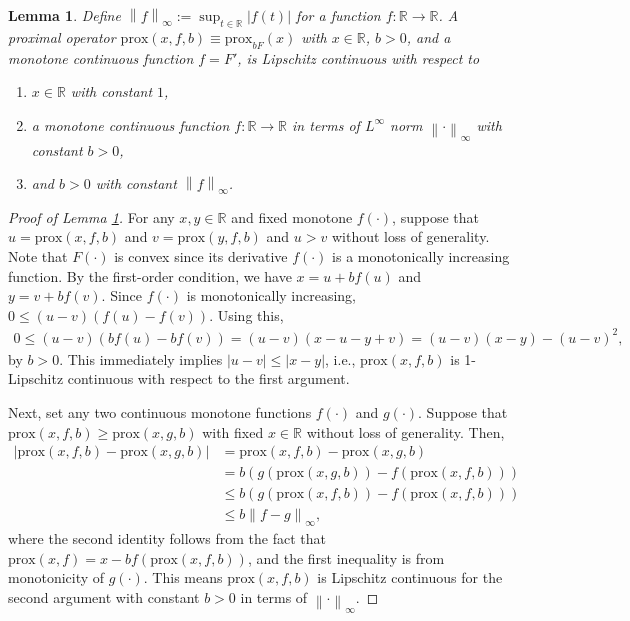 \documentclass[12pt,reqno]{amsart}
\newtheorem{lemma}{Lemma}
\newcommand{\abs}[1]{\left\lvert#1\right\rvert}
\newcommand{\norm}[1]{\left\lVert#1\right\rVert}
\newcommand{\rbr}[1]{\left(#1\right)}
\newcommand{\R}{\mathbb{R}}
\newcommand{\cc}{\color{black}}
\begin{document}
\begin{lemma}
\label{lem:lip-prox}
Define $\norm{f}_\infty:=\sup_{t\in\R}|f(t)|$ for a function $f:\R\to\R$. A proximal operator $\mathrm{prox}(x,f,b)\equiv\mathrm{prox}_{bF}(x)$ with $x\in\R$, $b>0$, and a monotone continuous function $f=F'$, is Lipschitz continuous with respect to
\begin{enumerate}
    \item[(i)] $x\in\R$ with constant $1$,
    \item[(ii)] a monotone continuous function $f:\R\rightarrow\R$ in terms of $L^\infty$ norm $\norm{\cdot}_\infty$ with constant $b>0$,
    \item[(iii)] and $b>0$ with constant $\norm{f}_\infty$.
\end{enumerate}
\end{lemma}
\begin{proof}[Proof of Lemma \ref{lem:lip-prox}] 
For any $x,y\in\R$ and fixed monotone $f(\cdot)$, suppose that $u=\text{prox}(x,f,b)$ and $v=\text{prox}(y,f,b)$ and $u>v$ without loss of generality. Note that $F(\cdot)$ is convex since its derivative $f(\cdot)$ is a monotonically increasing function. By the first-order condition, we have $x=u+bf(u)$ and $y=v+bf(v)$. Since $f(\cdot)$ is monotonically increasing, $0\le(u-v)(f(u)-f(v))$. Using this,
\begin{align*}
0\le(u-v)(bf(u)-bf(v))
=(u-v)(x-u-y+v)
=(u-v)(x-y)-(u-v)^2,
\end{align*}
by $b>0.$ This immediately implies $|u-v|\le|x-y|$, i.e., $\text{prox}(x,f,b)$ is 1-Lipschitz continuous with respect to the first argument.

Next, set any two continuous monotone functions $f(\cdot)$ and $g(\cdot)$. Suppose that $\text{prox}(x,f,b)\ge\text{prox}(x,g,b)$ with fixed $x\in\R$ without loss of generality. Then,
\begin{align}
\label{eq:lip-prox2}
\abs{{\text{prox}(x,f,b)-\text{prox}(x,g,b)}}
&={\text{prox}(x,f,b)-\text{prox}(x,g,b)}\nonumber\\
&=b\rbr{g(\text{prox}(x,g,b))-f(\text{prox}(x,f,b))}\nonumber\\
&\le b\rbr{g(\text{prox}(x,f,b))-f(\text{prox}(x,f,b))}\nonumber\\
&\le b\norm{f-g}_\infty,
\end{align}
where the second identity follows from the fact that $\text{prox}(x,f)=x-bf(\text{prox}(x,f,b))$, and the first inequality is from {\cc monotonicity} of $g(\cdot)$. This means $\text{prox}(x,f,b)$ is Lipschitz continuous for the second argument with constant $b>0$ in terms of $\norm{\cdot}_\infty$.


\end{proof}
\end{document}
